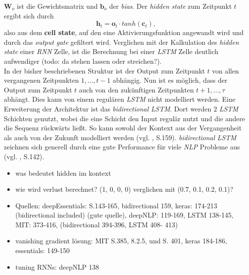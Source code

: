 \documentclass[a4paper,11pt]{article}
\begin{document}
$\bm{W}_o$ ist die Gewichtsmatrix und $\bm{b}_o$ der \textit{bias}. Der \textit{hidden state} zum Zeitpunkt $t$ ergibt sich durch
\[\bm{h}_t = \bm{o}_t \cdot tanh(\bm{c}_t) , \]
also aus dem \textbf{cell state}, auf den eine Aktivierungsfunktion angewandt wird und durch das \textit{output gate} gefiltert wird. Verglichen mit der Kalkulation des \textit{hidden state} einer \textit{RNN} Zelle, ist die Berechnung bei einer \textit{LSTM} Zelle deutlich aufwendiger (todo: da stehen lassen oder streichen?).\\

In der bisher beschriebenen Struktur ist der Output zum Zeitpunkt $t$ von allen vergangenen Zeitpunkten $1,...,t-1$ abhängig. Nun ist es möglich, dass der Output zum Zeitpunkt $t$ auch von den zukünftigen Zeitpunkten $t+1,..., \tau$ abhängt. Dies kann von einem regulären \textit{LSTM} nicht modelliert werden. Eine Erweiterung der Architektur ist das \textit{bidirectional LSTM}. Dort werden $2$ \textit{LSTM} Schichten genutzt, wobei die eine Schicht den Input regulär nutzt und die andere die Sequenz rückwärts ließt. So kann sowohl der Kontext aus der Vergangenheit als auch von der Zukunft modelliert werden (vgl. \cite{deepEssentials}, S.159).
\textit{bidirectional LSTM} zeichnen sich generell durch eine gute Performance für viele \textit{NLP} Probleme aus (vgl. \cite{deepNLP}, S.142).





\begin{itemize}
\item was bedeutet hidden im kontext
\item wie wird verlust berechnet? (1, 0, 0, 0) verglichen mit (0.7, 0.1, 0.2, 0.1)?
    \item Quellen: deepEssentials: S.143-165, bidirectional 159,  keras: 174-213 (bidirectional included) (gute quelle),  deepNLP: 119-169, LSTM 138-145, MIT: 373-416, (bidirectional 394-396, LSTM 408- 413)
    \item vanishing gradient lösung: MIT S.385, 8.2.5, und S. 401, keras 184-186, essentials: 149-150
    \item tuning RNNs: deepNLP 138
\end{itemize}{}
\end{document}
